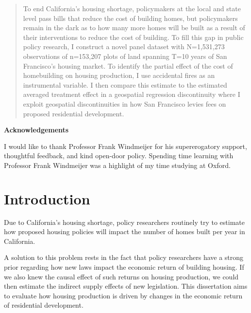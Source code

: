 \documentclass[a4paper,12pt]{article}
\begin{document}
\clearpage
\begin{abstract}
\noindent To end California's housing shortage, policymakers at the local and state level pass bills that reduce the cost of building homes, but policymakers remain in the dark as to how many more homes will be built as a result of their interventions to reduce the cost of building. To fill this gap in public policy research, I construct a novel panel dataset with N=1,531,273 observations of n=153,207 plots of land spanning T=10 years of San Francisco's housing market. To identify the partial effect of the cost of homebuilding on housing production, I use accidental fires as an instrumental variable. I then compare this estimate to the estimated averaged treatment effect in a geospatial regression discontinuity where I exploit geospatial discontinuities in how San Francisco levies fees on proposed residential development.

\end{abstract}
\clearpage
\vspace*{2in}
\begin{center}
\textbf{Acknowledgements}
\end{center}
I would like to thank Professor Frank Windmeijer for his supererogatory support, thoughtful feedback, and kind open-door policy. Spending time learning with Professor Frank Windmeijer was a highlight of my time studying at Oxford.
\clearpage
\tableofcontents
\listoffigures
\listoftables
\clearpage
{}

\section{Introduction}

Due to California's housing shortage,\cite{alamo2015california} policy researchers routinely try to estimate how proposed housing policies will impact the number of homes built per year in California.\cite{metcalf2021will}\cite{ab2011}\cite{la} 

A solution to this problem rests in the fact that policy researchers have a strong prior regarding how new laws impact the economic return of building housing.\cite{metcalf2021will}\cite{ab2011}\cite{la} If we also knew the causal effect of such returns on housing production, we could then estimate the indirect supply effects of new legislation. This dissertation aims to evaluate how housing production is driven by changes in the economic return of residential development. 
\end{document}
